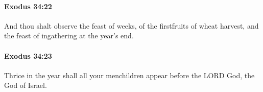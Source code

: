 		\paragraph{Exodus 34:22} %
			\label{EXODUS-34-22}

			And thou shalt observe the feast of weeks, of the firstfruits of wheat harvest, and the feast of ingathering at the year's end.


		\paragraph{Exodus 34:23} %
			\label{EXODUS-34-23}

			Thrice in the year shall all your menchildren appear before the LORD God, the God of Israel.


